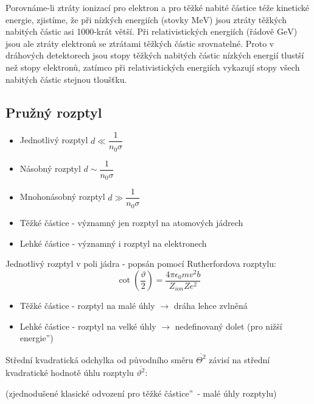\documentclass[../../main.tex]{subfiles}
\begin{document}
Porovnáme-li ztráty ionizací pro elektron a pro těžké nabité částice téže kinetické energie, zjistíme, že při nízkých energiích (stovky $\mathrm{MeV}$) jsou ztráty těžkých nabitých částic asi 1000-krát větší. Při relativistických energiích (řádově $\mathrm{GeV}$) jsou ale ztráty elektronů se ztrátami těžkých částic srovnatelné. Proto v dráhových detektorech jsou stopy těžkých nabitých částic nízkých energií tlustší než stopy elektronů, zatímco při relativistických energiích vykazují stopy všech nabitých částic stejnou tloušťku.

\subsection{Pružný rozptyl}

\begin{itemize}
	\item Jednotlivý rozptyl $d \ll \dfrac{1}{n_0 \sigma}$
	\item Násobný rozptyl $d \sim \dfrac{1}{n_0 \sigma}$
	\item Mnohonásobný rozptyl $d \gg \dfrac{1}{n_0 \sigma}$	
\end{itemize}

\begin{itemize}
	\item Těžké částice - významný jen rozptyl na atomových jádrech
	\item Lehké částice - významný i rozptyl na elektronech
\end{itemize}

Jednotlivý rozptyl v poli jádra - popsán pomocí Rutherfordova rozptylu:
\begin{equation}
\cot \left( \dfrac{\vartheta}{2}\right) = \dfrac{4 \pi \epsilon_0 m v^2 b}{Z_{ion} Z e^2}
\end{equation}

\begin{itemize}
	\item Těžké částice - rozptyl na malé úhly $\rightarrow$ dráha lehce zvlněná
	\item Lehké částice - rozptyl na velké úhly $\rightarrow$ nedefinovaný dolet (pro \quotedblbase nižší energie\textquotedblright)
\end{itemize}

Střední kvadratická odchylka od původního směru $\overline{\varTheta ^2}$ závisí na střední kvadratické hodnotě úhlu rozptylu $\overline{\vartheta ^2}$: 

(zjednodušené klasické odvození pro \quotedblbase těžké částice\textquotedblright ~- malé úhly rozptylu)
\end{document}
